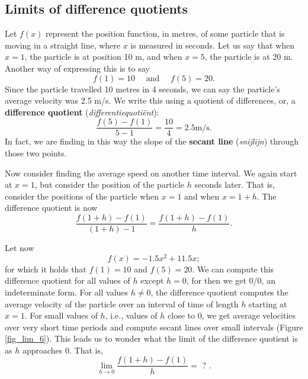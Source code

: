 \subsection{Limits of difference quotients}

Let $f(x)$ represent the position function, in metres, of some particle that is moving in a straight line, where $x$ is measured in seconds. Let us say that when $x=1$, the particle is at position 10 m, and when $x=5$, the particle is at 20 m. Another way of expressing this is to say 
$$f(1)=10 \quad \text{ and } \quad f(5) = 20.$$
Since the particle travelled 10 metres in 4 seconds, we can say the particle's average velocity was 2.5 m/s. We write this using a quotient of differences, or, a \textbf{difference quotient} (\textit{differentiequoti\"ent}): 
 $$\frac{f(5) - f(1)}{5-1} = \frac{10}4 = 2.5 \text{m/s}.$$
In fact, we are finding in this way the slope of the \textbf{secant line} (\textit{snijlijn}) through those two points.

Now consider finding the average speed on another time interval. We again start at $x=1$, but consider the position of the particle $h$ seconds later. That is, consider the positions of the particle when $x=1$ and when $x=1+h$. The difference quotient is now 
\begin{equation}
\frac{f(1+h)-f(1)}{(1+h)-1} = \frac{f(1+h)-f(1)}h.
\label{eq_lim_2}
\end{equation}

Let now 
$$f(x) = -1.5x^2+11.5x;$$
for which it holds that $f(1)=10$ and $f(5) = 20$. We can compute this difference quotient for all values of $h$ except $h=0$, for then we get 0/0, an indeterminate form. For all values $h\neq 0$, the difference quotient computes the average velocity of the particle over an interval of time of length $h$ starting at $x=1$.  For small values of $h$, i.e., values of $h$ close to 0, we get average velocities over very short time periods and compute secant lines over small intervals (Figure \ref{fig_lim_6}). This leads us to wonder what the limit of the difference quotient is as $h$ approaches 0. That is, 
$$\lim_{h\to 0} \frac{f(1+h)-f(1)}{h} = \text{ ? }.$$





